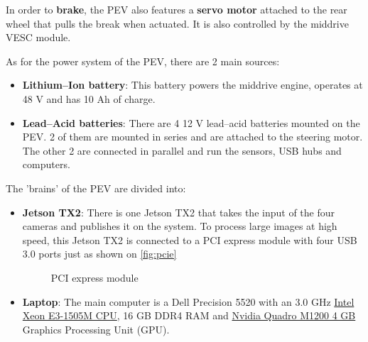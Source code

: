 In order to \textbf{brake}, the PEV also features a \textbf{servo motor} attached to the rear wheel that pulls the break when actuated. It is also controlled by the middrive VESC module.

 As for the power system of the PEV, there are 2 main sources:
\begin{itemize}
  \item \textbf{Lithium--Ion battery}: This battery powers the middrive engine, operates at 48 V and has 10 Ah of charge.

  \item \textbf{Lead--Acid batteries}: There are 4 12 V lead--acid batteries mounted on the PEV. 2 of them are mounted in series and are attached to the steering motor. The other 2 are connected in parallel and run the sensors, USB hubs and computers.
\end{itemize}

 The 'brains' of the PEV are divided into:
\begin{itemize}
  \item \textbf{Jetson TX2}: There is one Jetson TX2 that takes the input of the four cameras and publishes it on the system. To process large images at high speed, this Jetson TX2 is connected to a PCI express module with four USB 3.0 ports just as shown on \autoref{fig:pcie}
  \begin{figure}[h]
    \centering
    \caption{PCI express module}
    \label{fig:pcie}
  \end{figure}

  \item \textbf{Laptop}: The main computer is a Dell Precision 5520 with an 3.0 GHz \href{https://ark.intel.com/products/97463/Intel-Xeon-Processor-E3-1505M-v6-8M-Cache-3_00-GHz}{Intel Xeon E3-1505M CPU}, 16 GB DDR4 RAM and \href{https://www.nvidia.com/content/dam/en-zz/Solutions/design-visualization/documents/quadro-mobile-pro-graphics-line-card-us-r1-hr.pdf}{Nvidia Quadro M1200 4 GB} Graphics Processing Unit (GPU).
\end{itemize}


